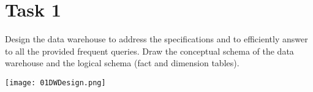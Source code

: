 \usepackage{graphicx}\section{Task 1}

\begin{question}
    Design the data warehouse to address the specifications and to efficiently answer to all
the provided frequent queries.
    Draw the conceptual schema of the data warehouse and the logical schema (fact and dimension tables).
\end{question}
\texttt{[image: 01DWDesign.png]}

\begin{answer}
\end{answer}